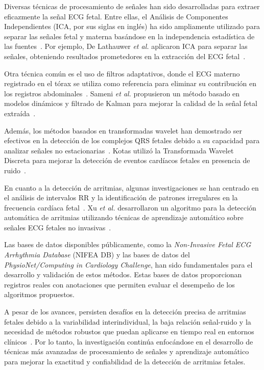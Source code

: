\documentclass[10pt, conference]{IEEEtran}
\begin{document}
Diversas técnicas de procesamiento de señales han sido desarrolladas para extraer eficazmente la señal ECG fetal. Entre ellas, el Análisis de Componentes Independientes (ICA, por sus siglas en inglés) ha sido ampliamente utilizado para separar las señales fetal y materna basándose en la independencia estadística de las fuentes~\cite{delathauwer2000fetal, zarzoso2001noninvasive}. Por ejemplo, De Lathauwer \textit{et al.} aplicaron ICA para separar las señales, obteniendo resultados prometedores en la extracción del ECG fetal~\cite{delathauwer2000fetal}.

Otra técnica común es el uso de filtros adaptativos, donde el ECG materno registrado en el tórax se utiliza como referencia para eliminar su contribución en los registros abdominales~\cite{widrow1975adaptive}. Sameni \textit{et al.} propusieron un método basado en modelos dinámicos y filtrado de Kalman para mejorar la calidad de la señal fetal extraída~\cite{sameni2008nonlinear}.

Además, los métodos basados en transformadas wavelet han demostrado ser efectivos en la detección de los complejos QRS fetales debido a su capacidad para analizar señales no estacionarias~\cite{addison2005wavelet}. Kotas utilizó la Transformada Wavelet Discreta para mejorar la detección de eventos cardíacos fetales en presencia de ruido~\cite{kotas2007detection}.

En cuanto a la detección de arritmias, algunas investigaciones se han centrado en el análisis de intervalos RR y la identificación de patrones irregulares en la frecuencia cardíaca fetal~\cite{taylor2003fetal}. Xu \textit{et al.} desarrollaron un algoritmo para la detección automática de arritmias utilizando técnicas de aprendizaje automático sobre señales ECG fetales no invasivas~\cite{xu2004rpeak}.

Las bases de datos disponibles públicamente, como la \textit{Non-Invasive Fetal ECG Arrhythmia Database} (NIFEA DB)\cite{behar2014non} y las bases de datos del \textit{PhysioNet/Computing in Cardiology Challenge}\cite{clifford2013physionet}, han sido fundamentales para el desarrollo y validación de estos métodos. Estas bases de datos proporcionan registros reales con anotaciones que permiten evaluar el desempeño de los algoritmos propuestos.

A pesar de los avances, persisten desafíos en la detección precisa de arritmias fetales debido a la variabilidad interindividual, la baja relación señal-ruido y la necesidad de métodos robustos que puedan aplicarse en tiempo real en entornos clínicos~\cite{andreotti2018clinical}. Por lo tanto, la investigación continúa enfocándose en el desarrollo de técnicas más avanzadas de procesamiento de señales y aprendizaje automático para mejorar la exactitud y confiabilidad de la detección de arritmias fetales.
\end{document}
